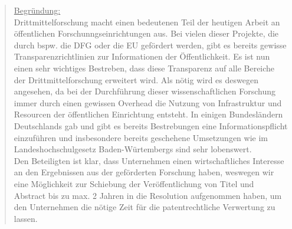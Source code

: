 \documentclass[10pt,oneside]{scrartcl}
\begin{document}
\begin{quote}
\underline{Begründung:}\\
Drittmittelforschung macht einen bedeutenen Teil der heutigen Arbeit an öffentlichen Forschunngseinrichtungen aus. Bei vielen dieser Projekte, die durch bspw. die DFG oder die EU gefördert werden, gibt es bereits gewisse Transparenzrichtlinien zur Informationen der Öffentlichkeit. Es ist nun einen sehr wichtiges Bestreben, dass diese Transparenz auf alle Bereiche der Drittmittelforschung erweitert wird. Als nötig wird es deswegen angesehen, da bei der Durchführung dieser wissenschaftlichen Forschung immer durch einen gewissen Overhead die Nutzung von Infrastruktur und Resourcen der öffentlichen Einrichtung entsteht. In einigen Bundesländern Deutschlands gab und gibt es bereits Bestrebungen eine Informationspflicht einzuführen und insbesondere bereits geschehene Umsetzungen wie im Landeshochschulgesetz Baden-Würtembergs sind sehr lobenswert.\\
Den Beteiligten ist klar, dass Unternehmen einen wirtschaftliches Interesse an den Ergebnissen aus der geförderten Forschung haben, weswegen wir eine Möglichkeit zur Schiebung der Veröffentlichung von Titel und Abstract bis zu max. 2 Jahren in die Resolution aufgenommen haben, um den Unternehmen die nötige Zeit für die patentrechtliche Verwertung zu lassen.

\end{quote}
\end{document}
